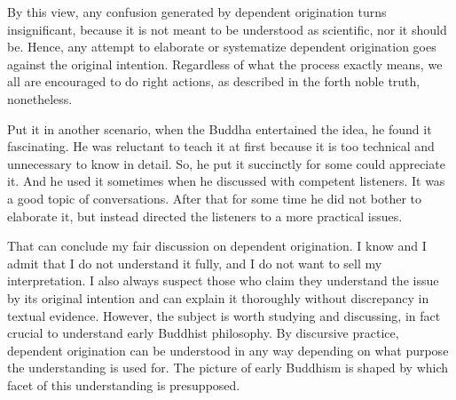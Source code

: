 By this view, any confusion generated by dependent origination turns insignificant, because it is not meant to be understood as scientific, nor it should be. Hence, any attempt to elaborate or systematize dependent origination goes against the original intention. Regardless of what the process exactly means, we all are encouraged to do right actions, as described in the forth noble truth, nonetheless.

Put it in another scenario, when the Buddha entertained the idea, he found it fascinating. He was reluctant to teach it at first because it is too technical and unnecessary to know in detail. So, he put it succinctly for some could appreciate it. And he used it sometimes when he discussed with competent listeners. It was a good topic of conversations. After that for some time he did not bother to elaborate it, but instead directed the listeners to a more practical issues.

\bigskip
That can conclude my fair discussion on dependent origination. I know and I admit that I do not understand it fully, and I do not want to sell my interpretation. I also always suspect those who claim they understand the issue by its original intention and can explain it thoroughly without discrepancy in textual evidence. However, the subject is worth studying and discussing, in fact crucial to understand early Buddhist philosophy. By discursive practice, dependent origination can be understood in any way depending on what purpose the understanding is used for. The picture of early Buddhism is shaped by which facet of this understanding is presupposed.

